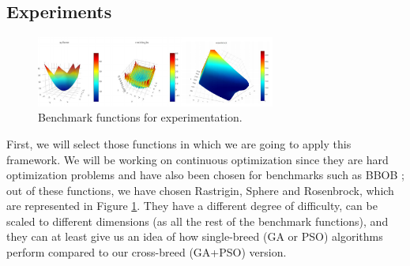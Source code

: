 \documentclass[runningheads]{llncs}
\begin{document}
  \subsection{Experiments}

\begin{figure}[htp] \centering
\includegraphics[width=0.7\textwidth]{img/benchmark.png} 
\caption{Benchmark
functions for experimentation.} 
\label{fig:functions} 
\end{figure}  

First, we will select those functions in which we are going to apply this framework. We
will be working on continuous optimization since they are hard optimization
problems and have also been chosen for benchmarks such as BBOB
\cite{hansen2010bbob}; out of these functions, we have chosen Rastrigin, Sphere
and Rosenbrock, which are represented in Figure \ref{fig:functions}. They have a
different degree of difficulty, can be scaled to different dimensions (as all
the rest of the benchmark functions), and they can at least give us an idea of
how single-breed (GA or PSO) algorithms perform compared to our cross-breed
(GA+PSO) version.  
\end{document}
